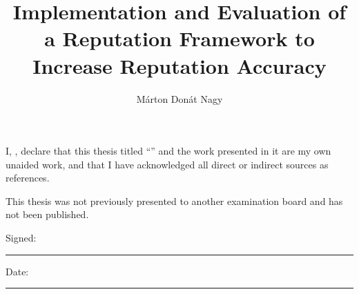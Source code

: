 \documentclass[%
    ]{\PathToTumTemplate/thesis/tum_thesis}
\title{Implementation and Evaluation of a Reputation Framework to Increase Reputation Accuracy}                          %
\author{Márton Donát Nagy}                         %
\begin{document}
\frontmatter

\maketitle

\newcommand{\thecolophon}{  
    \begin{colophon}
        \vspace*{1cm}     
        \begin{minipage}{0.5\textwidth}\begin{flushleft}
        This thesis was typeset using the XeTeX{} 
        typesetting system developed by Jonathan Kew. 
        \end{flushleft}
        \end{minipage}
    \end{colophon}
}


\begin{authordecl}
    \noindent I, \theauthor, declare that this thesis titled
    ``\thetitle'' and the work presented in it are my own unaided
    work, and that I have acknowledged all direct or indirect sources as
    references.

    This thesis was not previously presented to another examination board
    and has not been published.

    \vspace{2em}

    \noindent Signed:\\\vspace{1em}
    \noindent\rule[0.5em]{25em}{0.5pt} %
     
    \noindent Date:\\\vspace{1em}
    \noindent\rule[0.5em]{25em}{0.5pt} %
    \rmfamily
\end{authordecl}
\cleardoublepage
\end{document}
